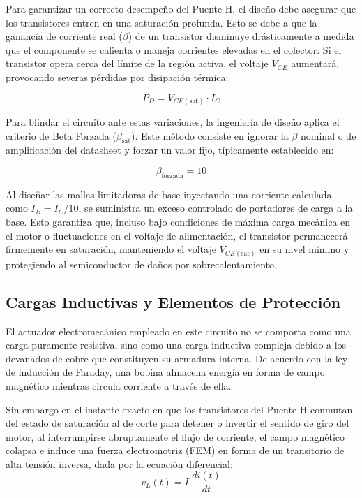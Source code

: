 \documentclass[journal]{IEEEtran}
\begin{document}
    Para garantizar un correcto desempeño del Puente H, el diseño debe asegurar que los transistores entren en una saturación profunda. 
    Esto se debe a que la ganancia de corriente real ($\beta$) de un transistor disminuye drásticamente a medida que el componente se 
    calienta o maneja corrientes elevadas en el colector. Si el transistor opera cerca del límite de la región activa, 
    el voltaje $V_{CE}$ aumentará, provocando severas pérdidas por disipación térmica:

    \begin{equation*}
        P_D = V_{CE(\text{sat})} \cdot I_C
        \label{ec:potencia_disipada}
    \end{equation*}

    Para blindar el circuito ante estas variaciones, la ingeniería de diseño aplica el criterio de Beta Forzada ($\beta_{\text{sat}}$). 
    Este método consiste en ignorar la $\beta$ nominal o de amplificación del datasheet y forzar un valor fijo, típicamente establecido en:

    \begin{equation*}
        \beta_{\text{forzada}} = 10
        \label{ec:beta_forzada}
    \end{equation*}

    Al diseñar las mallas limitadoras de base inyectando una corriente calculada como $I_B = I_C / 10$, se suministra un exceso controlado de portadores de carga a la base. Esto garantiza que, incluso bajo condiciones de máxima carga mecánica en el motor o fluctuaciones en el voltaje de alimentación, el transistor permanecerá firmemente en saturación, manteniendo el voltaje $V_{CE(\text{sat})}$ en su nivel mínimo y protegiendo al semiconductor de daños por sobrecalentamiento.
    
    \subsection{Cargas Inductivas y Elementos de Protección}
    El actuador electromecánico empleado en este circuito no se comporta como una carga puramente resistiva, sino como una carga inductiva compleja debido a los devanados de cobre que 
    constituyen su armadura interna. De acuerdo con la ley de inducción de Faraday, una bobina almacena 
    energía en forma de campo magnético mientras circula corriente a través de ella. 
    
    Sin embargo en el instante exacto en que los transistores del Puente H 
    conmutan del estado de saturación al de corte para detener o invertir el sentido de giro del motor, al interrumpirse abruptamente el flujo de corriente, el campo magnético 
    colapsa e induce una fuerza electromotriz (FEM) en forma de un transitorio de alta tensión inversa, dada por la ecuación diferencial:
    \begin{equation*}
        v_L(t) = L \frac{di(t)}{dt}
        \label{ec:fuerza_contraelectromotriz}
    \end{equation*}
\end{document}

